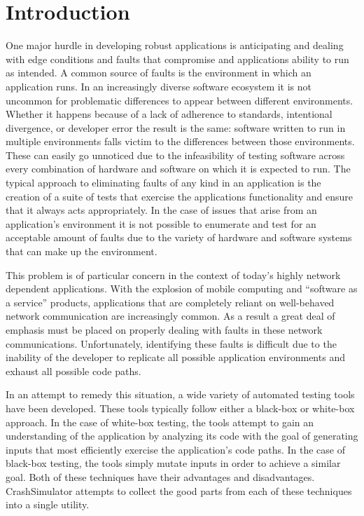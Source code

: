 \section{Introduction}

    One major hurdle in developing robust applications is anticipating and dealing with edge conditions and faults that
    compromise and applications ability to run as intended. A common source of faults is the environment in which an
    application runs. In an increasingly diverse software ecosystem it is not uncommon for problematic differences to
    appear between different environments. Whether it happens because of a lack of adherence to standards, intentional
    divergence, or developer error the result is the same: software written to run in multiple environments falls victim
    to the differences between those environments. These can easily go unnoticed due to the infeasibility of testing
    software across every combination of hardware and software on which it is expected to run. The typical approach to
    eliminating faults of any kind in an application is the creation of a suite of tests that exercise the applications
    functionality and ensure that it always acts appropriately. In the case of issues that arise from an application's
    environment it is not possible to enumerate and test for an acceptable amount of faults due to the variety of
    hardware and software systems that can make up the environment.

    This problem is of particular concern in the context of today's highly network dependent applications. With the
    explosion of mobile computing and ``software as a service'' products, applications that are completely reliant on
    well-behaved network communication are increasingly common. As a result a great deal of emphasis must be placed on
    properly dealing with faults in these network communications. Unfortunately, identifying these faults is difficult
    due to the inability of the developer to replicate all possible application environments and exhaust all possible
    code paths.

    In an attempt to remedy this situation, a wide variety of automated testing tools have been developed. These tools
    typically follow either a black-box or white-box approach. In the case of white-box testing, the tools attempt to
    gain an understanding of the application by analyzing its code with the goal of generating inputs that most
    efficiently exercise the application's code paths. In the case of black-box testing, the tools simply mutate inputs
    in order to achieve a similar goal. Both of these techniques have their advantages and disadvantages. CrashSimulator
    attempts to collect the good parts from each of these techniques into a single utility.

